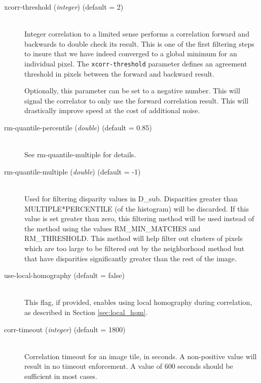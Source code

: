 \begin{description}
\item[xcorr-threshold \textnormal{\small{(\emph{integer})}} (default = 2)] \hfill \\

  Integer correlation to a limited sense performs a correlation
  forward and backwards to double check its result. This is one of the
  first filtering steps to insure that we have indeed converged to a
  global minimum for an individual pixel. The \texttt{xcorr-threshold}
  parameter defines an agreement threshold in pixels between the
  forward and backward result.

  Optionally, this parameter can be set to a negative number. This
  will signal the correlator to only use the forward correlation
  result. This will drastically improve speed at the cost of
  additional noise.

\item[rm-quantile-percentile \textnormal{\small{(\emph{double})}} (default = 0.85)] \hfill \\
  See rm-quantile-multiple for details.

\item[rm-quantile-multiple \textnormal{\small{(\emph{double})}} (default = -1)] \hfill \\
  Used for filtering disparity values in D\_sub.  Disparities 
  greater than MULTIPLE*PERCENTILE (of the histogram) will be discarded.  
  If this value is set greater
  than zero, this filtering method will be used instead of the
  method using the values RM\_MIN\_MATCHES and RM\_THRESHOLD.
  This method will help filter out clusters of pixels which are too large to be
  filtered out by the neighborhood method but that have disparities significantly
  greater than the rest of the image.

\item[use-local-homography \textnormal (default = false)] \hfill \\

  This flag, if provided, enables using local homography during
  correlation, as described in Section \ref{sec:local_hom}.

\item[corr-timeout \textnormal{\small{(\emph{integer})}} (default = 1800)]\hfill \\

  Correlation timeout for an image tile, in seconds. A non-positive
value will result in no timeout enforcement. A value of 600 seconds
should be sufficient in most cases.

\end{description}


